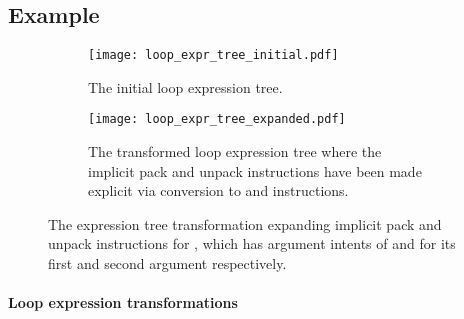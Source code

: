 \documentclass[thesis]{subfiles}
\begin{document}

\subsection{Example}

\begin{figure}
  \centering

  \begin{subfigure}[t]{.3\textwidth}
    \texttt{[image: loop\_expr\_tree\_initial.pdf]}
    \caption{The initial loop expression tree.}
    \label{fig:loop_expr_tree_transform_initial}
  \end{subfigure}
  \hfill
  \begin{subfigure}[t]{.68\textwidth}
    \texttt{[image: loop\_expr\_tree\_expanded.pdf]}
    \caption{The transformed loop expression tree where the implicit pack and unpack instructions have been made explicit via conversion to  and  instructions.}
    \label{fig:loop_expr_tree_transform_expanded}
  \end{subfigure}

  \caption{
    The expression tree transformation expanding implicit pack and unpack instructions for , which has argument intents of  and  for its first and second argument respectively.
  }
  \label{fig:loop_expr_tree_transform}
\end{figure}

\paragraph{Loop expression transformations}
\end{document}
